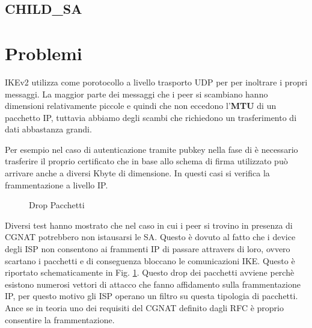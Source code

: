 \subsection{CHILD\_SA}

\newpage
\section{Problemi}

IKEv2 utilizza come porotocollo a livello trasporto UDP per per inoltrare i propri messaggi. La maggior parte dei messaggi che i peer si scambiano hanno dimensioni relativamente piccole e
quindi che non eccedono l'\textbf{MTU} di un pacchetto IP, tuttavia abbiamo degli scambi che richiedono un trasferimento di dati abbastanza grandi.

Per esempio nel caso di autenticazione tramite pubkey nella fase di  è necessario trasferire il proprio certificato che in base allo schema di firma utilizzato
può arrivare anche a diversi Kbyte di dimensione. In questi casi si verifica la frammentazione a livello IP.


\begin{figure}[htbp]
    \centering
    \vspace*{1cm}
    \caption{Drop Pacchetti}
    \label{fig:cgnatdrop}
\end{figure}

Diversi test hanno mostrato che nel caso in cui i peer si trovino in presenza di CGNAT potrebbero non istausarsi le SA. Questo è dovuto al fatto che i device degli ISP non
consentono ai frammenti IP di passare attravers di loro, ovvero scartano i pacchetti e di conseguenza bloccano le comunicazioni IKE.
Questo è riportato schematicamente in Fig. \ref{fig:cgnatdrop}.
Questo drop dei pacchetti avviene perchè esistono numerosi vettori di attacco che fanno affidamento sulla frammentazione IP, per questo motivo gli ISP operano un filtro su questa tipologia di pacchetti.
Ance se in teoria uno dei requisiti del CGNAT definito dagli RFC è proprio consentire la frammentazione.

